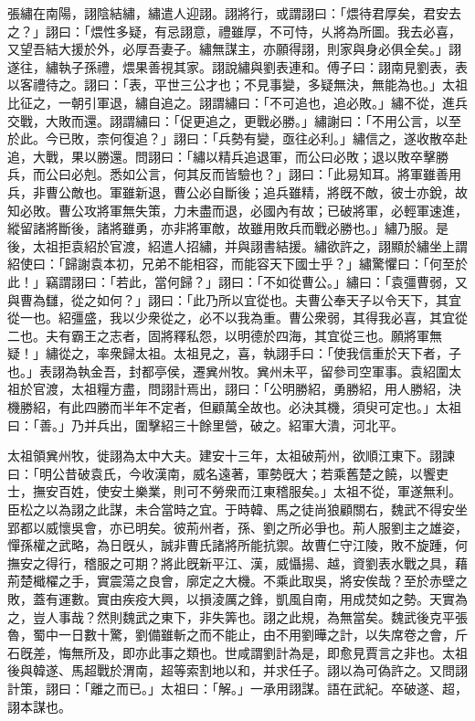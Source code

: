 \begin{pinyinscope}
張繡在南陽，詡陰結繡，繡遣人迎詡。詡將行，或謂詡曰：「煨待君厚矣，君安去之？」詡曰：「煨性多疑，有忌詡意，禮雖厚，不可恃，乆將為所圖。我去必喜，又望吾結大援於外，必厚吾妻子。繡無謀主，亦願得詡，則家與身必俱全矣。」詡遂往，繡執子孫禮，煨果善視其家。詡說繡與劉表連和。傅子曰：詡南見劉表，表以客禮待之。詡曰：「表，平世三公才也；不見事變，多疑無決，無能為也。」太祖比征之，一朝引軍退，繡自追之。詡謂繡曰：「不可追也，追必敗。」繡不從，進兵交戰，大敗而還。詡謂繡曰：「促更追之，更戰必勝。」繡謝曰：「不用公言，以至於此。今已敗，柰何復追？」詡曰：「兵勢有變，亟往必利。」繡信之，遂收散卒赴追，大戰，果以勝還。問詡曰：「繡以精兵追退軍，而公曰必敗；退以敗卒擊勝兵，而公曰必剋。悉如公言，何其反而皆驗也？」詡曰：「此易知耳。將軍雖善用兵，非曹公敵也。軍雖新退，曹公必自斷後；追兵雖精，將旣不敵，彼士亦銳，故知必敗。曹公攻將軍無失策，力未盡而退，必國內有故；已破將軍，必輕軍速進，縱留諸將斷後，諸將雖勇，亦非將軍敵，故雖用敗兵而戰必勝也。」繡乃服。是後，太祖拒袁紹於官渡，紹遣人招繡，并與詡書結援。繡欲許之，詡顯於繡坐上謂紹使曰：「歸謝袁本初，兄弟不能相容，而能容天下國士乎？」繡驚懼曰：「何至於此！」竊謂詡曰：「若此，當何歸？」詡曰：「不如從曹公。」繡曰：「袁彊曹弱，又與曹為讎，從之如何？」詡曰：「此乃所以宜從也。夫曹公奉天子以令天下，其宜從一也。紹彊盛，我以少衆從之，必不以我為重。曹公衆弱，其得我必喜，其宜從二也。夫有霸王之志者，固將釋私怨，以明德於四海，其宜從三也。願將軍無疑！」繡從之，率衆歸太祖。太祖見之，喜，執詡手曰：「使我信重於天下者，子也。」表詡為執金吾，封都亭侯，遷兾州牧。兾州未平，留參司空軍事。袁紹圍太祖於官渡，太祖糧方盡，問詡計焉出，詡曰：「公明勝紹，勇勝紹，用人勝紹，決機勝紹，有此四勝而半年不定者，但顧萬全故也。必決其機，須臾可定也。」太祖曰：「善。」乃并兵出，圍擊紹三十餘里營，破之。紹軍大潰，河北平。

太祖領兾州牧，徙詡為太中大夫。建安十三年，太祖破荊州，欲順江東下。詡諫曰：「明公昔破袁氏，今收漢南，威名遠著，軍勢旣大；若乘舊楚之饒，以饗吏士，撫安百姓，使安土樂業，則可不勞衆而江東稽服矣。」太祖不從，軍遂無利。臣松之以為詡之此謀，未合當時之宜。于時韓、馬之徒尚狼顧關右，魏武不得安坐郢都以威懷吳會，亦已明矣。彼荊州者，孫、劉之所必爭也。荊人服劉主之雄姿，憚孫權之武略，為日旣乆，誠非曹氏諸將所能抗禦。故曹仁守江陵，敗不旋踵，何撫安之得行，稽服之可期？將此旣新平江、漢，威懾揚、越，資劉表水戰之具，藉荊楚檝櫂之手，實震蕩之良會，廓定之大機。不乘此取吳，將安俟哉？至於赤壁之敗，蓋有運數。實由疾疫大興，以損淩厲之鋒，凱風自南，用成焚如之勢。天實為之，豈人事哉？然則魏武之東下，非失筭也。詡之此規，為無當矣。魏武後克平張魯，蜀中一日數十驚，劉備雖斬之而不能止，由不用劉曄之計，以失席卷之會，斤石旣差，悔無所及，即亦此事之類也。世咸謂劉計為是，即愈見賈言之非也。太祖後與韓遂、馬超戰於渭南，超等索割地以和，并求任子。詡以為可偽許之。又問詡計策，詡曰：「離之而已。」太祖曰：「解。」一承用詡謀。語在武紀。卒破遂、超，詡本謀也。


\end{pinyinscope}
